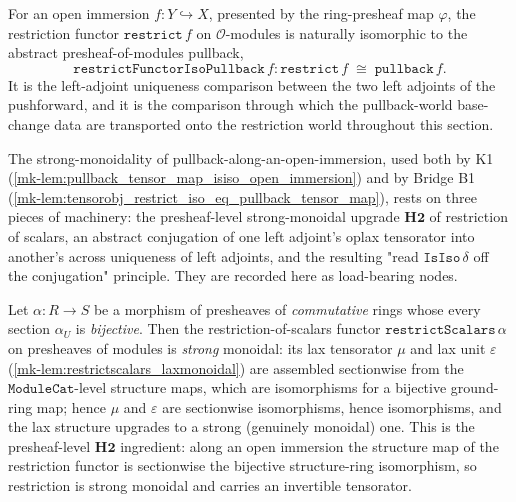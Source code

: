 \begin{definition}
  \label{mk-def:restrictfunctorisopullback}
  \mathlibok

  For an open immersion \(f : Y \hookrightarrow X\), presented by the ring-presheaf map
  \(\varphi\), the restriction functor \(\mathtt{restrict}\,f\) on \(\mathcal{O}\)-modules is
  naturally isomorphic to the abstract presheaf-of-modules pullback,
  \[
    \mathtt{restrictFunctorIsoPullback}\,f :
      \mathtt{restrict}\,f \;\cong\; \mathtt{pullback}\,f .
  \]
  It is the left-adjoint uniqueness comparison between the two left adjoints of the
  pushforward, and it is the comparison through which the pullback-world base-change data are
  transported onto the restriction world throughout this section.
\end{definition}
The strong-monoidality of pullback-along-an-open-immersion, used both by K1
(\ref{mk-lem:pullback_tensor_map_isiso_open_immersion}) and by Bridge B1
(\ref{mk-lem:tensorobj_restrict_iso_eq_pullback_tensor_map}), rests on three pieces of machinery: the
presheaf-level strong-monoidal upgrade \(\mathbf{H2}\) of restriction of scalars, an abstract
conjugation of one left adjoint's oplax tensorator into another's across uniqueness of left
adjoints, and the resulting "read \(\mathtt{IsIso}\,\delta\) off the conjugation" principle. They are
recorded here as load-bearing nodes.

\begin{lemma}\label{mk-lem:restrictscalars_monoidal_of_bijective}
  \leanok

  Let \(\alpha : R \to S\) be a morphism of presheaves of \emph{commutative} rings whose every
  section \(\alpha_U\) is \emph{bijective}. Then the restriction-of-scalars functor
  \(\mathtt{restrictScalars}\,\alpha\) on presheaves of modules is \emph{strong} monoidal: its lax
  tensorator \(\mu\) and lax unit \(\varepsilon\) (\ref{mk-lem:restrictscalars_laxmonoidal}) are
  assembled sectionwise from the \(\mathtt{ModuleCat}\)-level structure maps, which are isomorphisms
  for a bijective ground-ring map; hence \(\mu\) and \(\varepsilon\) are sectionwise isomorphisms,
  hence isomorphisms, and the lax structure upgrades to a strong (genuinely monoidal) one. This is
  the presheaf-level \(\mathbf{H2}\) ingredient: along an open immersion the structure map of the
  restriction functor is sectionwise the bijective structure-ring isomorphism, so restriction is
  strong monoidal and carries an invertible tensorator.
\end{lemma}

